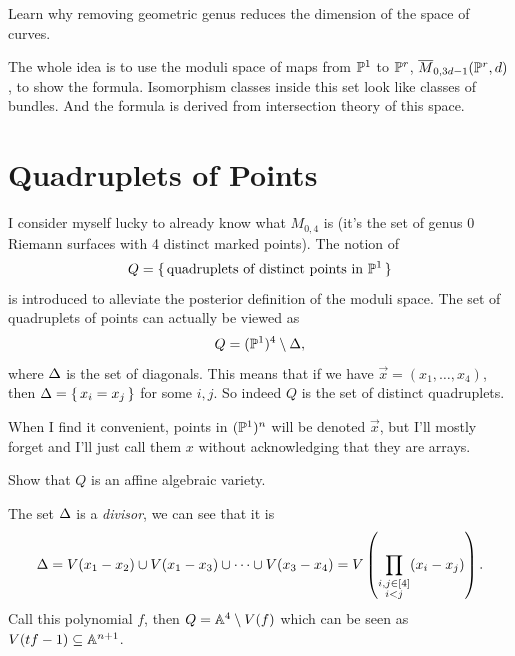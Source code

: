 \documentclass[12pt]{memoir}
\begin{document}
\begin{Ej}
Learn why removing geometric genus reduces the dimension of the space of curves.
\end{Ej}

\begin{ptcb}
\end{ptcb}

The whole idea is to use the moduli space of maps from $\mathbb{P}^1$ to $\mathbb{P}^r$, $\overline M_{0,3d-1}(\mathbb{P}^r,d)$, to show the formula. Isomorphism classes inside this set look like classes of bundles. And the formula is derived from intersection theory of this space. 

\section{Quadruplets of Points}

I consider myself lucky to already know what $M_{0,4}$ is (it's the set of genus 0 Riemann surfaces with 4 distinct marked points). The notion of 
$$Q=\{\,\text{quadruplets of distinct points in }\mathbb{P}^1\,\}$$
is introduced to alleviate the posterior definition of the moduli space. The set of quadruplets of points can actually be viewed as 
$$Q=(\mathbb{P}^1)^4\setminus\Delta,$$
where $\Delta$ is the set of diagonals. This means that if we have $\vec x=(x_1,\dots,x_4)$, then $\Delta=\{\,x_i=x_j\,\}$ for some $i,j$. So indeed $Q$ is the set of distinct quadruplets. 

\begin{Rmk}
    When I find it convenient, points in $(\mathbb{P}^1)^n$ will be denoted $\vec x$, but I'll mostly forget and I'll just call them $x$ without acknowledging that they are arrays.
\end{Rmk}

\begin{Ej}
Show that $Q$ is an affine algebraic variety. 
\end{Ej}

\begin{ptcb}
    The set $\Delta$ is a \emph{divisor}, we can see that it is 
    $$\Delta=V(x_1-x_2)\cup V(x_1-x_3)\cup\cdots\cup V(x_3-x_4)=V\left(\prod_{\substack{i,j\in\left\lbrack4\right\rbrack\\ i<j}}(x_i-x_j)\right).$$
    Call this polynomial $f$, then $Q=\mathbb{A}^4\setminus V(f)$ which can be seen as $V(tf-1)\subseteq \mathbb{A}^{n+1}$.
    \end{ptcb}
\end{document}

